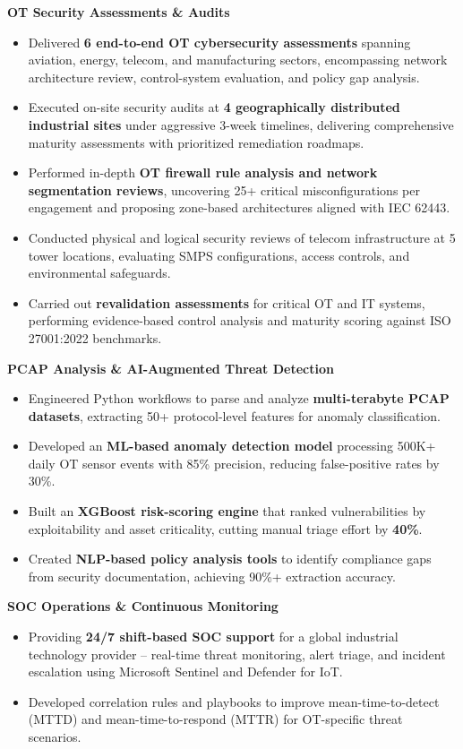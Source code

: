 \documentclass[11pt,letterpaper]{article}
\begin{document}
\vspace{4pt}
\textbf{OT Security Assessments \& Audits}
\begin{itemize}
  \item Delivered \textbf{6 end-to-end OT cybersecurity assessments} spanning aviation, energy, telecom, and manufacturing sectors, encompassing network architecture review, control-system evaluation, and policy gap analysis.
  \item Executed on-site security audits at \textbf{4 geographically distributed industrial sites} under aggressive 3-week timelines, delivering comprehensive maturity assessments with prioritized remediation roadmaps.
  \item Performed in-depth \textbf{OT firewall rule analysis and network segmentation reviews}, uncovering 25+ critical misconfigurations per engagement and proposing zone-based architectures aligned with IEC 62443.
  \item Conducted physical and logical security reviews of telecom infrastructure at 5 tower locations, evaluating SMPS configurations, access controls, and environmental safeguards.
  \item Carried out \textbf{revalidation assessments} for critical OT and IT systems, performing evidence-based control analysis and maturity scoring against ISO 27001:2022 benchmarks.
\end{itemize}

\vspace{4pt}
\textbf{PCAP Analysis \& AI-Augmented Threat Detection}
\begin{itemize}
  \item Engineered Python workflows to parse and analyze \textbf{multi-terabyte PCAP datasets}, extracting 50+ protocol-level features for anomaly classification.
  \item Developed an \textbf{ML-based anomaly detection model} processing 500K+ daily OT sensor events with 85\% precision, reducing false-positive rates by 30\%.
  \item Built an \textbf{XGBoost risk-scoring engine} that ranked vulnerabilities by exploitability and asset criticality, cutting manual triage effort by \textbf{40\%}.
  \item Created \textbf{NLP-based policy analysis tools} to identify compliance gaps from security documentation, achieving 90\%+ extraction accuracy.
\end{itemize}

\vspace{4pt}
\textbf{SOC Operations \& Continuous Monitoring}
\begin{itemize}
  \item Providing \textbf{24/7 shift-based SOC support} for a global industrial technology provider -- real-time threat monitoring, alert triage, and incident escalation using Microsoft Sentinel and Defender for IoT.
  \item Developed correlation rules and playbooks to improve mean-time-to-detect (MTTD) and mean-time-to-respond (MTTR) for OT-specific threat scenarios.
\end{itemize}
\end{document}
